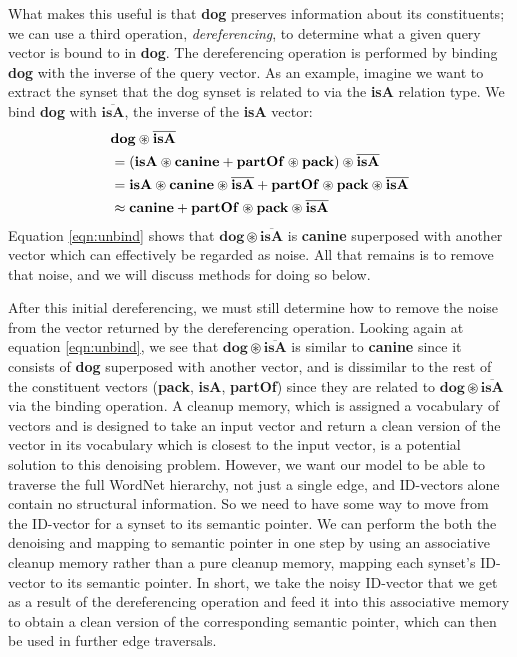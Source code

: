 \documentclass[10pt,letterpaper]{article}
\begin{document}
What makes this useful is that \textbf{dog} preserves information about its constituents; we can use a third operation, \textit{dereferencing}, to determine what a given query vector is bound to in \textbf{dog}. The dereferencing operation is performed by binding \textbf{dog} with the inverse of the query vector. As an example, imagine we want to extract the synset that the dog synset is related to via the \textbf{isA} relation type. We bind \textbf{dog} with $\overline{\mathbf{isA}}$, the inverse of the \textbf{isA} vector:
\begin{align}
&\mathbf{dog} \circledast \overline{\mathbf{isA} }\notag\\
&=(\mathbf{isA} \circledast \mathbf{canine} + \mathbf{partOf} \circledast \mathbf{pack}) \circledast \overline{\mathbf{isA} }\notag\\
&=\mathbf{isA} \circledast \mathbf{canine} \circledast \overline{\mathbf{isA} } + \mathbf{partOf} \circledast \mathbf{pack} \circledast \overline{\mathbf{isA} }\notag\\
&\approx \mathbf{canine} + \mathbf{partOf} \circledast \mathbf{pack} \circledast \overline{\mathbf{isA} }\label{eqn:unbind}
\end{align}
Equation \eqref{eqn:unbind} shows that $\mathbf{dog \circledast \overline{isA}}$ is \textbf{canine} superposed with another vector which can effectively be regarded as noise. All that remains is to remove that noise, and we will discuss methods for doing so below.
 
After this initial dereferencing, we must still determine how to remove the noise from the vector returned by the dereferencing operation. Looking again at equation \eqref{eqn:unbind}, we see that $\mathbf{dog \circledast \overline{isA}}$ is similar to \textbf{canine} since it consists of \textbf{dog} superposed with another vector, and is dissimilar to the rest of the constituent vectors (\textbf{pack}, \textbf{isA}, \textbf{partOf}) since they are related to $\mathbf{dog \circledast \overline{isA}}$ via the binding operation. A cleanup memory, which is assigned a vocabulary of vectors and is designed to take an input vector and return a clean version of the vector in its vocabulary which is closest to the input vector, is a potential solution to this denoising problem. However, we want our model to be able to traverse the full WordNet hierarchy, not just a single edge, and ID-vectors alone contain no structural information. So we need to have some way to move from the ID-vector for a synset to its semantic pointer. We can perform the both the denoising and mapping to semantic pointer in one step by using an associative cleanup memory rather than a pure cleanup memory, mapping each synset's ID-vector to its semantic pointer. In short, we take the noisy ID-vector that we get as a result of the dereferencing operation and feed it into this associative memory to obtain a clean version of the corresponding semantic pointer, which can then be used in further edge traversals.
\end{document}
